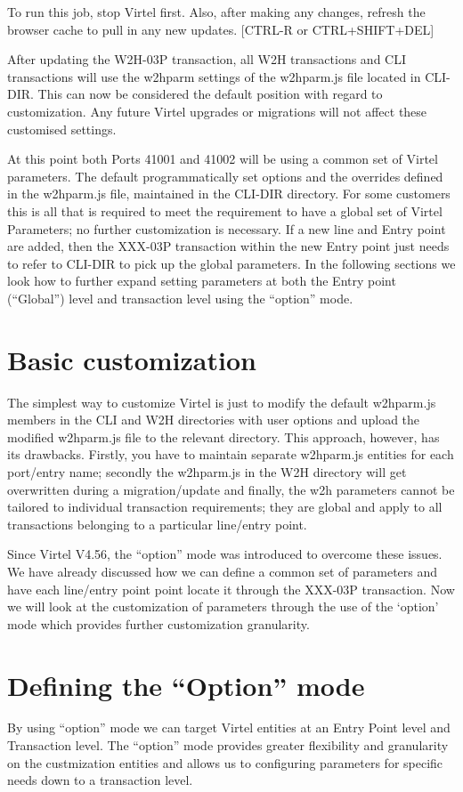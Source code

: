 \documentclass[letterpaper,10pt,english]{sphinxmanual}
\begin{document}
To run this job, stop Virtel first. Also, after making any changes, refresh the browser cache to pull in any new updates. {[}CTRL-R or CTRL+SHIFT+DEL{]}

After updating the W2H-03P transaction, all W2H transactions and CLI transactions will use the w2hparm settings of the w2hparm.js file located in CLI-DIR. This can now be considered the default position with regard to customization. Any future Virtel upgrades or migrations will not affect these customised settings.

At this point both Ports 41001 and 41002 will be using a common set of Virtel parameters. The default programmatically set options and the overrides defined in the w2hparm.js file, maintained in the CLI-DIR directory. For some customers this is all that is required to meet the requirement to have a global set of Virtel Parameters; no further customization is necessary. If a new line and Entry point are added, then the XXX-03P transaction within the new Entry point just needs to refer to CLI-DIR to pick up the global parameters. In the following sections we look how to further expand setting parameters at both the Entry point (“Global”) level and transaction level using the “option” mode.


\section{Basic customization}
\label{\detokenize{TN202002:basic-customization}}
The simplest way to customize Virtel is just to modify the default w2hparm.js members in the CLI and W2H directories with user options and upload the modified w2hparm.js file to the relevant directory. This approach, however, has its drawbacks. Firstly, you have to maintain separate w2hparm.js entities for each port/entry name; secondly the w2hparm.js in the W2H directory will get overwritten during a migration/update and finally, the w2h parameters cannot be tailored to individual transaction requirements; they are global and apply to all transactions belonging to a particular line/entry point.

Since Virtel V4.56, the “option” mode was introduced to overcome these issues. We have already discussed how we can define a common set of parameters and have each line/entry point point locate it through the XXX-03P transaction. Now we will look at the customization of parameters through the use of the ‘option’ mode which provides further customization granularity.


\section{Defining the “Option” mode}
\label{\detokenize{TN202002:defining-the-option-mode}}
By using “option” mode we can target Virtel entities at an Entry Point level and Transaction level. The “option” mode provides greater flexibility and granularity on the custmization entities and  allows us to configuring parameters for specific needs down to a transaction level.
\end{document}
